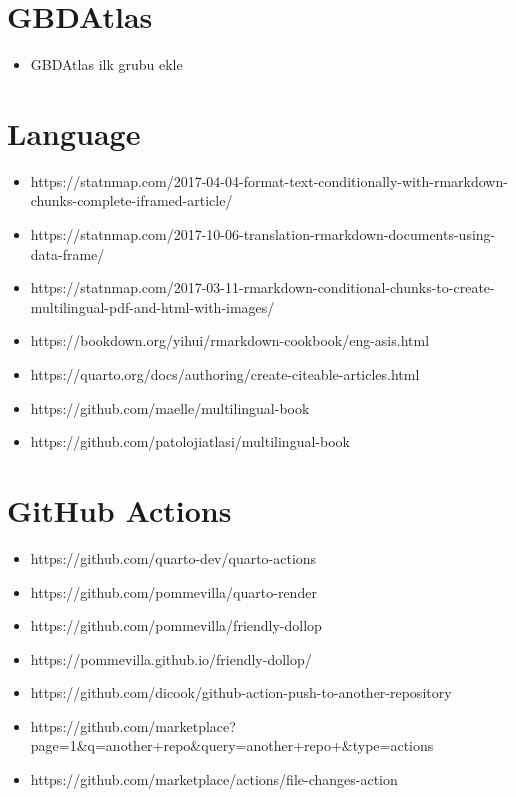 \documentclass[
  letterpaper,
  DIV=11,
  numbers=noendperiod]{scrreprt}
\providecommand{\tightlist}{%
  \setlength{\itemsep}{0pt}\setlength{\parskip}{0pt}}\usepackage{longtable,booktabs,array}
\begin{document}
\hypertarget{gbdatlas}{%
\section{GBDAtlas}\label{gbdatlas}}

\begin{itemize}
\tightlist
\item
  GBDAtlas ilk grubu ekle
\end{itemize}

\hypertarget{language}{%
\section{Language}\label{language}}

\begin{itemize}
\tightlist
\item
  https://statnmap.com/2017-04-04-format-text-conditionally-with-rmarkdown-chunks-complete-iframed-article/
\item
  https://statnmap.com/2017-10-06-translation-rmarkdown-documents-using-data-frame/
\item
  https://statnmap.com/2017-03-11-rmarkdown-conditional-chunks-to-create-multilingual-pdf-and-html-with-images/
\item
  https://bookdown.org/yihui/rmarkdown-cookbook/eng-asis.html
\item
  https://quarto.org/docs/authoring/create-citeable-articles.html
\item
  https://github.com/maelle/multilingual-book
\item
  https://github.com/patolojiatlasi/multilingual-book
\end{itemize}

\hypertarget{github-actions}{%
\section{GitHub Actions}\label{github-actions}}

\begin{itemize}
\tightlist
\item
  https://github.com/quarto-dev/quarto-actions
\item
  https://github.com/pommevilla/quarto-render
\item
  https://github.com/pommevilla/friendly-dollop
\item
  https://pommevilla.github.io/friendly-dollop/
\item
  https://github.com/dicook/github-action-push-to-another-repository
\item
  https://github.com/marketplace?page=1\&q=another+repo\&query=another+repo+\&type=actions
\item
  https://github.com/marketplace/actions/file-changes-action
\end{itemize}
\end{document}
